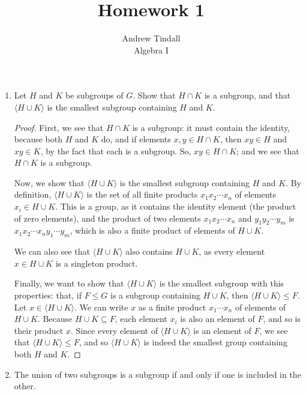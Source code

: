 \documentclass[12pt]{article}
\theoremstyle{definition}
\newenvironment{problem}[2][Problem]{\begin{trivlist}
\item[\hskip \labelsep {\bfseries #1}\hskip \labelsep {\bfseries #2.}]}{\end{trivlist}}
\begin{document}
 
 
\title{Homework 1}
\author{Andrew Tindall\\
Algebra I}
 
\maketitle
\begin{problem}{1}
\begin{enumerate}[label=(\alph*)]
    \item Let $H$ and $K$ be subgroups of $G$. Show that $H \cap K$ is a subgroup, and that $\langle H \cup K \rangle$ is the smallest subgroup containing $H$ and $K$.
    \begin{proof}
    First, we see that $H \cap K$ is a subgroup: it must contain the identity, because both $H$ and $K$ do, and if elements $x, y \in H \cap K$, then $xy \in H$ and $xy \in K$, by the fact that each is a subgroup. So, $xy \in H \cap K$; and we see that $H \cap K$ is a subgroup.
    \par Now, we show that $\langle H \cup K \rangle$ is the smallest subgroup containing $H$ and $K$. By definition, $\langle H \cup K \rangle$ is the set of all finite products $x_1x_2\cdots x_n$ of elements $x_i \in H \cup K$. This is a group, as it contains the identity element (the product of zero elements), and the product of two elements $x_1x_2 \cdots x_n$ and $y_1y_2 \cdots y_m$ is $x_1x_2 \cdots x_ny_1 \cdots y_m$, which is also a finite product of elements of $H \cup K$. 
    \par We can also see that $\langle H \cup K \rangle$ also contains $H \cup K$, as every element $x \in H \cup K$ is a singleton product.
    \par Finally, we want to show that $\langle H \cup K \rangle$ is the smallest subgroup with this properties: that, if $F \leq G$ is a subgroup containing $H \cup K$, then $\langle H \cup K \rangle \leq F$. Let $x \in \langle H \cup K \rangle$. We can write $x$ as a finite product $x_1 \cdots x_n$ of elements of $H \cup K$. Because $H \cup K \subseteq F$, each element $x_i$ is also an element of $F$, and so is their product $x$. Since every element of $\langle H \cup K \rangle$ is an element of $F$, we see that $\langle H \cup K \rangle \leq F$, and so $\langle H \cup K \rangle$ is indeed the smallest group containing both $H$ and $K$.
    \end{proof}
    \item The union of two subgroups is a subgroup if and only if one is included in the other.

\end{enumerate}
\end{problem}
\end{document}
